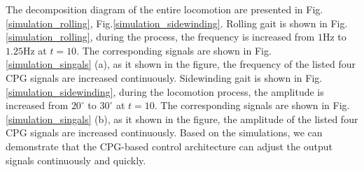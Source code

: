 \documentclass[letterpaper, 10 pt, conference]{ieeeconf}
\begin{document}


The decomposition diagram of the entire locomotion are presented in Fig.\ref{simulation_rolling}, Fig.\ref{simulation_sidewinding}. Rolling gait is shown in Fig.\ref{simulation_rolling}, during the process, the frequency is increased from $1$Hz to $1.25$Hz at $t=10$. The corresponding signals are shown in Fig. \ref{simulation_singals} (a), as it shown in the figure, the frequency of the listed four CPG signals are increased continuously. Sidewinding gait is shown in Fig.\ref{simulation_sidewinding}, during the locomotion process, the amplitude is increased from $20^{\circ}$ to $30^{\circ}$ at $t=10$. The corresponding signals are shown in Fig. \ref{simulation_singals} (b), as it shown in the figure, the amplitude of the listed four CPG signals are increased continuously. Based on the simulations, we can demonstrate that the CPG-based control architecture can adjust the output signals continuously and quickly.

\end{document}
